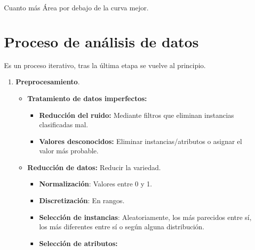 \documentclass[12pt, twoside, openright]{report} %
\begin{document}
Cuanto más Área por debajo de la curva mejor.

\section{Proceso de análisis de
  datos}

Es un proceso iterativo, tras la última etapa se vuelve al principio.

\begin{enumerate}
	\def\labelenumi{\arabic{enumi}.}
	\item \textbf{Preprocesamiento}.

	      \begin{itemize}
		      \item \textbf{Tratamiento de datos imperfectos:}

		            \begin{itemize}
			            \item \textbf{Reducción del ruido:} Mediante filtros que eliminan instancias clasificadas mal.
			            \item \textbf{Valores desconocidos:} Eliminar instancias/atributos o asignar el valor más probable.
		            \end{itemize}
		      \item \textbf{Reducción de datos:} Reducir la variedad.

		            \begin{itemize}
			            \item \textbf{Normalización}: Valores entre 0 y 1.
			            \item \textbf{Discretización}: En rangos.
			            \item \textbf{Selección de instancias}: Aleatoriamente, los más parecidos entre sí, los más diferentes entre sí o según alguna distribución.
			            \item \textbf{Selección de atributos:}


\end{itemize}
\end{itemize}
\end{enumerate}
\end{document}
